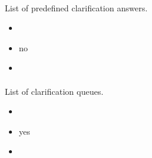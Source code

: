 \documentclass[a4paper,10pt,english,openany]{sphinxmanual}
\begin{document}
\paragraph{}
\label{\detokenize{configuration-reference:clar-answers}}
\sphinxAtStartPar
List of pre\sphinxhyphen{}defined clarification answers.
\begin{itemize}
\item {} 
\sphinxAtStartPar
{} 

\item {} 
\sphinxAtStartPar
{} no

\item {} 
\sphinxAtStartPar
{}

\begin{sphinxVerbatim}[commandchars=\\\{\}]
\PYG{p}{[}
\PYG{p}{]}
\end{sphinxVerbatim}

\end{itemize}


\paragraph{}
\label{\detokenize{configuration-reference:clar-queues}}
\sphinxAtStartPar
List of clarification queues.
\begin{itemize}
\item {} 
\sphinxAtStartPar
{} 

\item {} 
\sphinxAtStartPar
{} yes

\item {} 
\sphinxAtStartPar
{}

\begin{sphinxVerbatim}[commandchars=\\\{\}]
\end{sphinxVerbatim}

\end{itemize}
\end{document}
